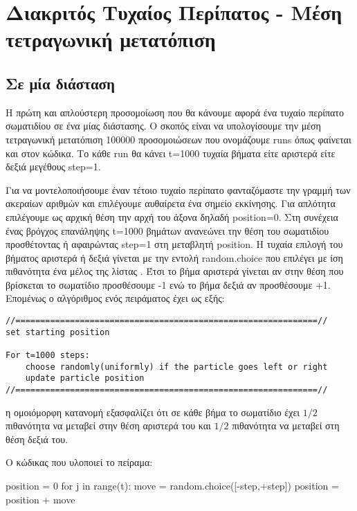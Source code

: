 \section{Διακριτός Τυχαίος Περίπατος - Μέση τετραγωνική μετατόπιση}
\subsection{Σε μία διάσταση}

Η πρώτη και απλούστερη προσομοίωση που θα κάνουμε αφορά ένα τυχαίο περίπατο σωματιδίου σε ένα  μίας διάστασης. Ο σκοπός είναι να υπολογίσουμε την μέση τετραγωνική μετατόπιση 100000 προσομοιώσεων που ονομάζουμε {\en runs} όπως φαίνεται και στον κώδικα. Το κάθε {\en run} θα κάνει {\en t}=1000 τυχαία βήματα είτε αριστερά είτε δεξιά μεγέθους {\en step}=1.

Για να μοντελοποιήσουμε έναν τέτοιο τυχαίο περίπατο φανταζόμαστε την γραμμή των ακεραίων αριθμών και επιλέγουμε αυθαίρετα ένα σημείο εκκίνησης. Για απλότητα επιλέγουμε ως αρχική θέση την αρχή του άξονα δηλαδή {\en position}=0. Στη συνέχεια ένας βρόγχος επανάληψης {\en t}=1000 βημάτων ανανεώνει την θέση του σωματιδίου προσθέτοντας ή αφαιρώντας {\en step}=1 στη μεταβλητή {\en position}. Η τυχαία επιλογή του βήματος αριστερά ή δεξιά γίνεται με την εντολή {\en random.choice} που επιλέγει με ίση πιθανότητα ένα μέλος της λίστας {}. Έτσι το βήμα αριστερά γίνεται αν στην θέση που βρίσκεται το σωματίδιο προσθέσουμε -1 ενώ το βήμα δεξιά αν προσθέσουμε +1. Επομένως ο αλγόριθμος ενός πειράματος έχει ως εξής:
\en

\pagebreak

\begin{lstlisting}
//=============================================================//
set starting position 

For t=1000 steps:
    choose randomly(uniformly) if the particle goes left or right
    update particle position
//=============================================================//
\end{lstlisting}
\gr
η ομοιόμορφη κατανομή εξασφαλίζει ότι σε κάθε βήμα το σωματίδιο έχει $1/2$ πιθανότητα να μεταβεί στην θέση αριστερά του και $1/2$ πιθανότητα να μεταβεί στη θέση δεξιά του.

O κώδικας που υλοποιεί το πείραμα:
\en
\begin{python}
position = 0
for j in range(t):
    move = random.choice([-step,+step])
    position = position + move
\end{python}

